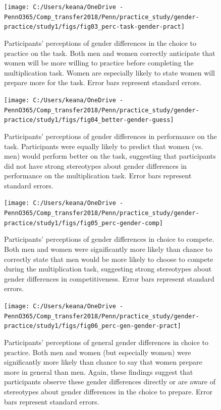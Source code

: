 \documentclass[a4paper, nobind]{templates/ociamthesis}
\begin{document}
\begin{figure}
\texttt{[image: C:/Users/keana/OneDrive - PennO365/Comp\_transfer2018/Penn/practice\_study/gender-practice/study1/figs/fig03\_perc-task-gender-pract]} \caption{Participants' perceptions of gender differences in the choice to practice on the task. Both men and women correctly anticipate that women will be more willing to practice before completing the multiplication task. Women are especially likely to state women will prepare more for the task. Error bars represent standard errors.}\label{fig:s103}
\end{figure}

\begin{figure}
\texttt{[image: C:/Users/keana/OneDrive - PennO365/Comp\_transfer2018/Penn/practice\_study/gender-practice/study1/figs/fig04\_better-gender-guess]} \caption{Participants' perceptions of gender differences in performance on the task. Participants were equally likely to predict that women (vs. men) would perform better on the task, suggesting that participants did not have strong stereotypes about gender differences in performance on the multiplication task. Error bars represent standard errors.}\label{fig:s104}
\end{figure}

\begin{figure}
\texttt{[image: C:/Users/keana/OneDrive - PennO365/Comp\_transfer2018/Penn/practice\_study/gender-practice/study1/figs/fig05\_perc-gender-comp]} \caption{Participants' perceptions of gender differences in choice to compete. Both men and women were significantly more likely than chance to correctly state that men would be more likely to choose to compete during the multiplication task, suggesting strong stereotypes about gender differences in competitiveness. Error bars represent standard errors.}\label{fig:s105}
\end{figure}

\begin{figure}
\texttt{[image: C:/Users/keana/OneDrive - PennO365/Comp\_transfer2018/Penn/practice\_study/gender-practice/study1/figs/fig06\_perc-gen-gender-pract]} \caption{Participants' perceptions of general gender differences in choice to practice. Both men and women (but especially women) were significantly more likely than chance to say that women prepare more in general than men. Again, these findings suggest that participants observe these gender differences directly or are aware of stereotypes about gender differences in the choice to prepare. Error bars represent standard errors.}\label{fig:s106}
\end{figure}
\end{document}
